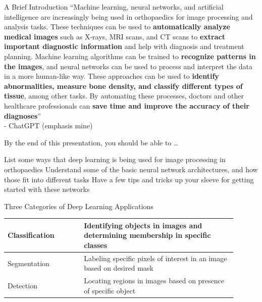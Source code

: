 \begin{frame}{A Brief Introduction}
   ``Machine learning, neural networks, and artificial intelligence are increasingly being used in orthopaedics for image processing and analysis tasks. These techniques can be used to {\bf automatically analyze medical images} such as X-rays, MRI scans, and CT scans to {\bf extract important diagnostic information} and help with diagnosis and treatment planning. Machine learning algorithms can be trained to {\bf recognize patterns in the images}, and neural networks can be used to process and interpret the data in a more human-like way. These approaches can be used to {\bf identify abnormalities, measure bone density, and classify different types of tissue}, among other tasks. By automating these processes, doctors and other healthcare professionals can {\bf save time and improve the accuracy of their diagnoses}'' \\
\vspace{5mm}
   \hfill - ChatGPT (emphasis mine)
\end{frame}

\begin{frame}{By the end of this presentation, you should be able to \dots}
   \begin{baseitemize}
      \itemR List some ways that deep learning is being used for image processing in orthopaedics
      \itemR Understand some of the basic neural network architectures, and how those fit into different tasks
      \itemR Have a few tips and tricks up your sleeve for getting started with these networks
      \itemR
   \end{baseitemize}
\end{frame}

\begin{frame}{Three Categories of Deep Learning Applications}
   \renewcommand{\arraystretch}{2}
   \begin{center}
            \begin{tabular}{M{0.3\linewidth}|P{0.6\linewidth}}
               \pause Classification & Identifying objects in images and determining membership in specific classes \pause \\ \hline
               Segmentation & Labeling specific pixels of interest in an image based on desired mask \pause \\ \hline
               Detection & Locating regions in images based on presence of specific object
            \end{tabular}
      \end{center}
\end{frame}

